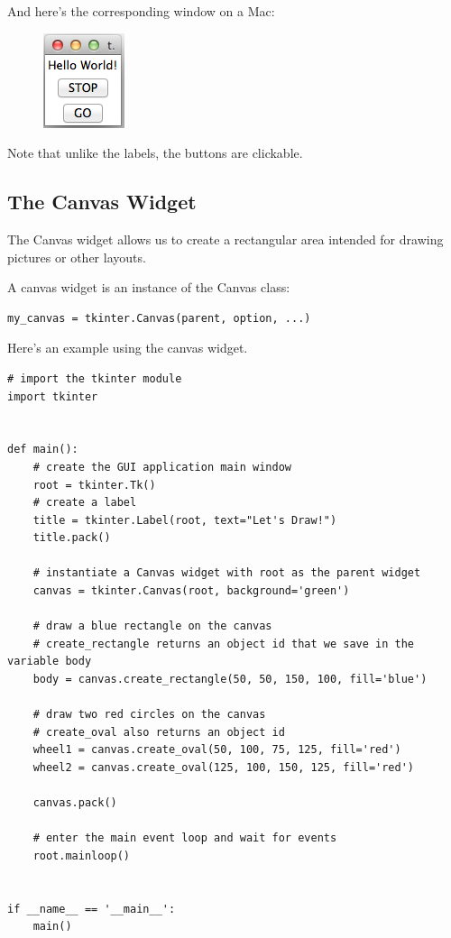 \documentclass{article}
\begin{document}
And here's the corresponding window on a Mac:
\begin{figure}[h]
\includegraphics[]{MACbuttons}\\
\end{figure}

Note that unlike the labels, the buttons are clickable.

\subsection{The Canvas Widget}
The Canvas widget allows us to create a rectangular area intended for drawing pictures or other layouts. 

A canvas widget is an instance of the Canvas class:

\begin{lstlisting}
my_canvas = tkinter.Canvas(parent, option, ...)
\end{lstlisting}

Here's an example using the canvas widget.

\begin{lstlisting}
# import the tkinter module
import tkinter


def main():
    # create the GUI application main window
    root = tkinter.Tk()
    # create a label
    title = tkinter.Label(root, text="Let's Draw!")
    title.pack()

    # instantiate a Canvas widget with root as the parent widget
    canvas = tkinter.Canvas(root, background='green')

    # draw a blue rectangle on the canvas
    # create_rectangle returns an object id that we save in the variable body
    body = canvas.create_rectangle(50, 50, 150, 100, fill='blue')

    # draw two red circles on the canvas
    # create_oval also returns an object id
    wheel1 = canvas.create_oval(50, 100, 75, 125, fill='red')
    wheel2 = canvas.create_oval(125, 100, 150, 125, fill='red')

    canvas.pack()

    # enter the main event loop and wait for events
    root.mainloop()


if __name__ == '__main__':
    main()
\end{lstlisting}    
\end{document}
